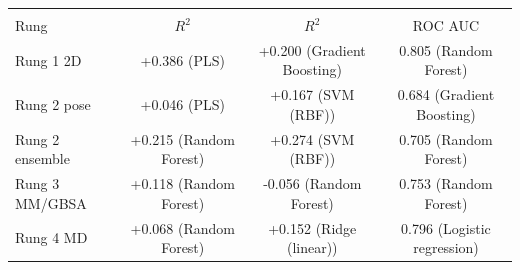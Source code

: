 \begin{tabular}{lccc}
\toprule
& \framingA{} & \framingB{} & \framingC{} \\
Rung & $R^2$ & $R^2$ & ROC AUC \\
\midrule
Rung 1 2D & +0.386 {\scriptsize (PLS)} & +0.200 {\scriptsize (Gradient Boosting)} & 0.805 {\scriptsize (Random Forest)} \\
Rung 2 pose & +0.046 {\scriptsize (PLS)} & +0.167 {\scriptsize (SVM (RBF))} & 0.684 {\scriptsize (Gradient Boosting)} \\
Rung 2 ensemble & +0.215 {\scriptsize (Random Forest)} & +0.274 {\scriptsize (SVM (RBF))} & 0.705 {\scriptsize (Random Forest)} \\
Rung 3 MM/GBSA & +0.118 {\scriptsize (Random Forest)} & -0.056 {\scriptsize (Random Forest)} & 0.753 {\scriptsize (Random Forest)} \\
Rung 4 MD & +0.068 {\scriptsize (Random Forest)} & +0.152 {\scriptsize (Ridge (linear))} & 0.796 {\scriptsize (Logistic regression)} \\
\bottomrule
\end{tabular}
